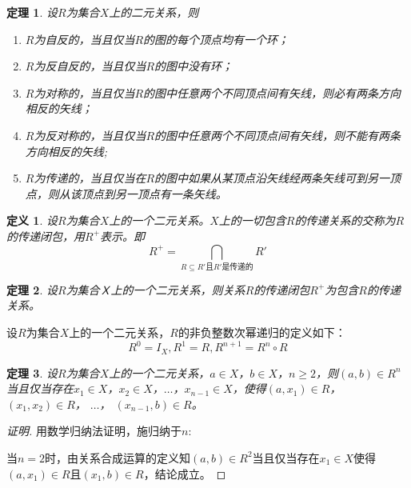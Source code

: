 \documentclass{book}[oneside]
\newtheorem{Def}{定义}[chapter]
\newtheorem{Thm}{定理}[chapter]
\begin{document}
\begin{CJK*}{UTF8}{gbsn}
{\begin{tikzpicture}[auto,
      specification/.style ={circle, draw, thick}]
  \end{tikzpicture}
}  

  \begin{Thm}
  设$R$为集合$X$上的二元关系，则
  \begin{enumerate}
  \item $R$为自反的，当且仅当$R$的图的每个顶点均有一个环；
  \item $R$为反自反的，当且仅当$R$的图中没有环；
  \item $R$为对称的，当且仅当$R$的图中任意两个不同顶点间有矢线，则必有两条方向相反的矢线；
  \item $R$为反对称的，当且仅当$R$的图中任意两个不同顶点间有矢线，则不能有两条方向相反的矢线;
  \item $R$为传递的，当且仅当在$R$的图中如果从某顶点沿矢线经两条矢线可到另一顶点，则从该顶点到另一顶点有一条矢线。
  \end{enumerate}
\end{Thm}

  \begin{Def}
    设$R$为集合$X$上的一个二元关系。$X$上的一切包含$R$的传递关系的交称为$R$的传递闭包，用$R^+$表示。即
    \begin{equation*}
      R^+ = \bigcap_{R \subseteq R' \text{且} R'\text{是传递的}}R'
    \end{equation*}
  \end{Def}
  \begin{Thm}
    设$R$为集合Ｘ上的一个二元关系，则关系$R$的传递闭包$R^+$为包含$R$的传递关系。
  \end{Thm}

  设$R$为集合$X$上的一个二元关系，$R$的非负整数次幂递归的定义如下：
  \[R^0=I_X,R^1=R,R^{n+1}=R^{n}\circ R\]

    \begin{Thm}
    设$R$为集合$X$上的一个二元关系，$a \in X$，$b \in X$，$n \geq 2$，则$(a,b) \in R^n$当且仅当存在$x_1\in X$，$x_2\in X$，$\ldots$，$x_{n-1}\in X$，使得$(a, x_1) \in R$，$(x_1, x_2)\in R$，  $\ldots$， $(x_{n-1}, b)\in R$。
  \end{Thm}
  \begin{proof}[证明]
  用数学归纳法证明，施归纳于$n$:

  当$n=2$时，由关系合成运算的定义知$(a,b)\in R^2$当且仅当存在$x_1\in X$使得$(a,x_1)\in R$且$(x_1, b)\in R$，结论成立。


\end{proof}
\end{CJK*}
\end{document}
